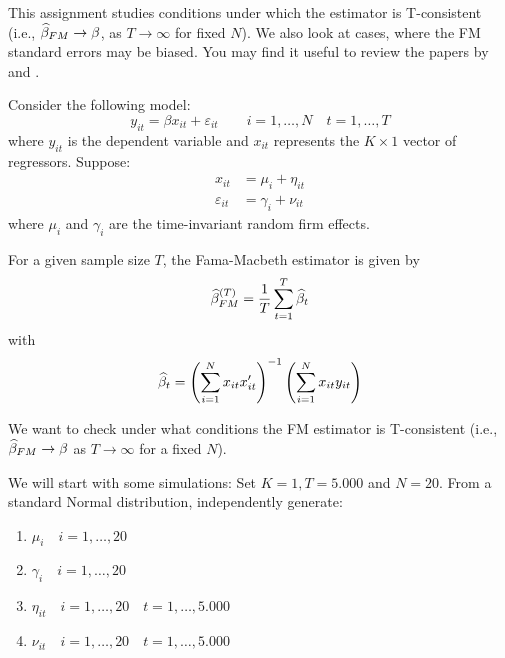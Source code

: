 This assignment studies conditions under which the \citeauthor{fama1973risk} estimator is T-consistent (i.e., \(\widehat{\beta}_{FM} \to \beta\), as \(T \to \infty\) for fixed \(N\)). We also look at cases, where the FM standard errors may be biased. You may find it useful to review the papers by \citet{petersen2008estimating} and \citet{skoulakis2008panel}.

Consider the following model:
\begin{equation}
\label{eq:y_dgp}
y_{it} = \beta x_{it} + \varepsilon_{it} \qquad i = 1, \dots, N \quad t = 1, \dots, T
\end{equation}
where \(y_{it}\) is the dependent variable and \(x_{it}\) represents the \(K\times 1\) vector of regressors. Suppose:
\begin{equation}
\label{eq:x_dgp}
\begin{aligned}
    x_{it} & = \mu_i + \eta_{it} \\
    \varepsilon_{it} & = \gamma_i + \nu_{it}
\end{aligned}
\end{equation}
where \(\mu_i\) and \(\gamma_i\) are the time-invariant random firm effects.

For a given sample size \(T\), the Fama-Macbeth estimator is given by
\begin{equation}
\label{eq:fm_estimator}
\widehat{\beta}^{(T)}_{FM} = \frac{1}{T} \sum_{t=1}^T  \widehat{\beta}_t
\end{equation}
with
\begin{equation}
\label{eq:beta_t}
\widehat{\beta}_t = \left( \sum_{i=1}^N x_{it}x_{it}^\prime \right)^{-1} \left( \sum_{i=1}^N x_{it}y_{it} \right)
\end{equation}

We want to check under what conditions the FM estimator is T-consistent (i.e., \(\widehat{\beta}_{FM} \to \beta\) as \(T\to\infty\) for a fixed \(N\)).

We will start with some simulations: Set \(K = 1, T = 5.000\) and \(N =20\). From a standard Normal distribution, independently generate:
\begin{enumerate}[label = \arabic*.]
\item \(\mu_i \quad i = 1, \dots, 20\)
\item \(\gamma_i \quad i = 1, \dots, 20\)
\item \(\eta_{it} \quad i = 1, \dots, 20 \quad t = 1, \dots, 5.000\)
\item \(\nu_{it} \quad i = 1, \dots, 20 \quad t = 1, \dots, 5.000\)
\end{enumerate}

